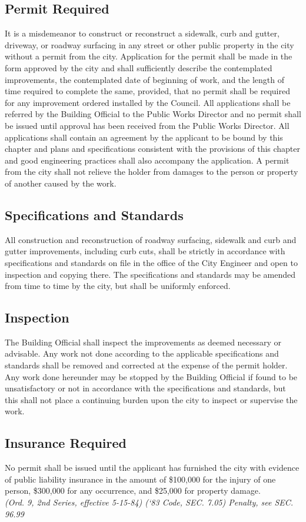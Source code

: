 \subsection{Permit Required}
It is a misdemeanor to construct or reconstruct a sidewalk, curb and gutter, driveway, or roadway surfacing in any street or other public property in the city without a permit from the city. Application for the permit shall be made in the form approved by the city and shall sufficiently describe the contemplated improvements, the contemplated date of beginning of work, and the length of time required to complete the same, provided, that no permit shall be required for any improvement ordered installed by the Council. All applications shall be referred by the Building Official to the Public Works Director and no permit shall be issued until approval has been received from the Public Works Director. All applications shall contain an agreement by the applicant to be bound by this chapter and plans and specifications consistent with the provisions of this chapter and good engineering practices shall also accompany the application. A permit from the city shall not relieve the holder from damages to the person or property of another caused by the work.
\subsection{Specifications and Standards}
All construction and reconstruction of roadway surfacing, sidewalk and curb and gutter improvements, including curb cuts, shall be strictly in accordance with specifications and standards on file in the office of the City Engineer and open to inspection and copying there.  The specifications and standards may be amended from time to time by the city, but shall be uniformly enforced.
\subsection{Inspection}
The Building Official shall inspect the improvements as deemed necessary or advisable.  Any work not done according to the applicable specifications and standards shall be removed and corrected at the expense of the permit holder.  Any work done hereunder may be stopped by the Building Official if found to be unsatisfactory or not in accordance with the specifications and standards, but this shall not place a continuing burden upon the city to inspect or supervise the work.
\subsection{Insurance Required}
No permit shall be issued until the applicant has furnished the city with evidence of public liability insurance in the amount of \$100,000 for the injury of one person, \$300,000 for any occurrence, and \$25,000 for property damage.\\
\emph{(Ord. 9, 2nd Series, effective 5-15-84)  (‘83 Code, SEC. 7.05)  Penalty, see SEC. 96.99}
